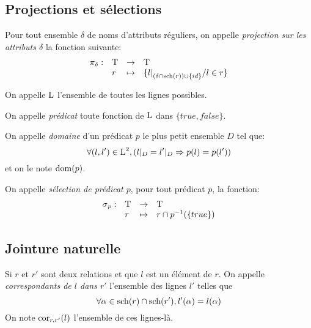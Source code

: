 \subsection*{Projections et sélections}
\begin{defi}
	Pour tout ensemble $\delta$ de noms d'attributs réguliers,
	on appelle \emph{projection sur les attributs $\delta$}
	la fonction suivante:
	$$
	\begin{array}{llcl}
	\operatorname{\pi}_{\delta}:	& \operatorname{T} 	& \rightarrow 	& \operatorname{T} \\
				& r		& \mapsto		& 
					\{{l|}_{(\delta\cap \operatorname{sch}(r)) \cup \{id\}} / l \in r \}
	\end{array}
	$$
\end{defi}

\begin{defi}
	On appelle $\operatorname{L}$ l'ensemble de toutes les lignes possibles.
	
	On appelle \emph{prédicat} toute fonction
	de $\operatorname{L}$ dans $\{true, false\}$.
	
	On appelle \emph{domaine} d'un prédicat $p$ le plus petit
	ensemble $D$ tel que:
	$$
	\forall (l, l') \in \operatorname{L}^2, (l|_D = l'|_D \Rightarrow  p(l) = p(l')) 
	$$
	et on le note $\operatorname{dom}(p)$.
\end{defi}

\begin{defi}
	On appelle \emph{sélection de prédicat $p$}, pour tout prédicat $p$, la fonction:
	$$
	\begin{array}{llcl}
	\operatorname{\sigma}_p: 	& \operatorname{T} 	& \rightarrow 	& \operatorname{T} \\
			& r		& \mapsto		& r \cap p^{-1}(\{true\})
	\end{array}
	$$
\end{defi}

\subsection*{Jointure naturelle}
\begin{defi}
	Si $r$ et $r'$ sont deux relations et que $l$
	est un élément de $r$.
	On appelle \emph{correspondants de $l$ dans $r'$}
	l'ensemble des lignes $l'$ telles que
	$$
	\forall \alpha \in \operatorname{sch}(r)\cap\operatorname{sch}(r'),
	l'(\alpha) = l(\alpha)
	$$
	On note $\operatorname{cor}_{r, r'}(l)$ l'ensemble de ces lignes-là.
\end{defi}

